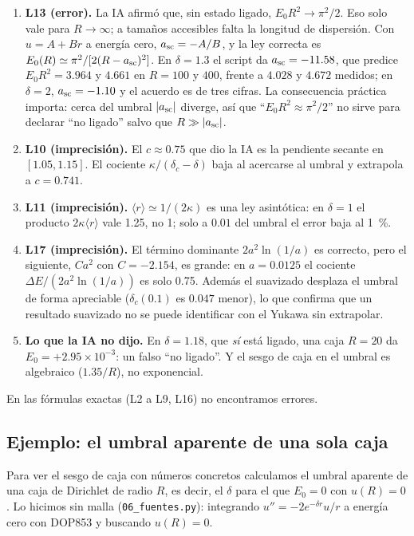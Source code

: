 \documentclass[11pt]{article}
\newcommand{\dc}{\delta_c}
\begin{document}
\begin{enumerate}
\item \textbf{L13 (error).} La IA afirmó que, sin estado ligado, $E_0R^2\to\pi^2/2$. Eso solo vale para $R\to\infty$; a tamaños accesibles falta la longitud de dispersión. Con $u=A+Br$ a energía cero, $a_{\rm sc}=-A/B$, y la ley correcta es $E_0(R)\simeq\pi^2/[2(R-a_{\rm sc})^2]$. En $\delta=1.3$ el script da $a_{\rm sc}=-11.58$, que predice $E_0R^2=3.964$ y $4.661$ en $R=100$ y $400$, frente a $4.028$ y $4.672$ medidos; en $\delta=2$, $a_{\rm sc}=-1.10$ y el acuerdo es de tres cifras. La consecuencia práctica importa: cerca del umbral $|a_{\rm sc}|$ diverge, así que ``$E_0R^2\approx\pi^2/2$'' no sirve para declarar ``no ligado'' salvo que $R\gg|a_{\rm sc}|$.
\item \textbf{L10 (imprecisión).} El $c\approx0.75$ que dio la IA es la pendiente secante en $[1.05,1.15]$. El cociente $\kappa/(\dc-\delta)$ baja al acercarse al umbral y extrapola a $c=0.741$.
\item \textbf{L11 (imprecisión).} $\langle r\rangle\simeq1/(2\kappa)$ es una ley asintótica: en $\delta=1$ el producto $2\kappa\langle r\rangle$ vale 1.25, no 1; solo a $0.01$ del umbral el error baja al 1~\%.
\item \textbf{L17 (imprecisión).} El término dominante $2a^2\ln(1/a)$ es correcto, pero el siguiente, $Ca^2$ con $C=-2.154$, es grande: en $a=0.0125$ el cociente $\Delta E/(2a^2\ln(1/a))$ es solo 0.75. Además el suavizado desplaza el umbral de forma apreciable ($\dc(0.1)$ es $0.047$ menor), lo que confirma que un resultado suavizado no se puede identificar con el Yukawa sin extrapolar.
\item \textbf{Lo que la IA no dijo.} En $\delta=1.18$, que \emph{sí} está ligado, una caja $R=20$ da $E_0=+2.95\times10^{-3}$: un falso ``no ligado''. Y el sesgo de caja en el umbral es algebraico ($1.35/R$), no exponencial.
\end{enumerate}
En las fórmulas exactas (L2 a L9, L16) no encontramos errores.

\subsection{Ejemplo: el umbral aparente de una sola caja}
\label{sec:caja}

Para ver el sesgo de caja con números concretos calculamos el umbral aparente de una caja de Dirichlet de radio $R$, es decir, el $\delta$ para el que $E_0=0$ con $u(R)=0$. Lo hicimos sin malla (\texttt{06\_fuentes.py}): integrando $u''=-2e^{-\delta r}u/r$ a energía cero con DOP853 y buscando $u(R)=0$.
\end{document}
